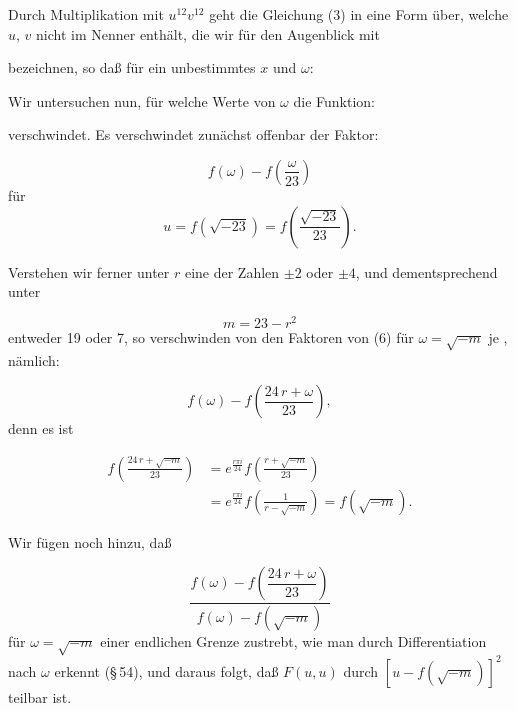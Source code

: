 
Durch Multiplikation mit $u^{12}v^{12}$ geht die Gleichung (3) in eine Form über, welche $u$, $v$ nicht im Nenner enthält, die wir für den Augenblick mit


bezeichnen, so daß für ein unbestimmtes $x$ und $\omega$:


Wir untersuchen nun, für welche Werte von $\omega$ die Funktion:


verschwindet. Es verschwindet zunächst offenbar der Faktor:

\[
f(\omega) - f\left(\frac{\omega}{23}\right)
\]
für
\[
u = f(\sqrt{-23}) = f\left(\frac{\sqrt{-23}}{23}\right).
\]

Verstehen wir ferner unter $r$ eine der Zahlen $\pm 2$ oder $\pm 4$, und dementsprechend unter

\[
m = 23 - r^2
\]
entweder 19 oder 7, so verschwinden von den Faktoren von (6) für $\omega = \sqrt{-m}$ je , nämlich:

\[
f(\omega) - f\left(\frac{24\,r + \omega}{23}\right),
\]
denn es ist

\[
\begin{aligned}
f\left(\frac{24\,r + \sqrt{-m}}{23}\right) &= e^{\frac{r\pi i}{24}} f\left(\frac{r + \sqrt{-m}}{23}\right) \\
&= e^{\frac{r\pi i}{24}} f\left(\frac{1}{r - \sqrt{-m}}\right) = f(\sqrt{-m}).
\end{aligned}
\]

Wir fügen noch hinzu, daß

\[
\frac{f(\omega) - f\left(\dfrac{24\,r + \omega}{23}\right)}{f(\omega) - f(\sqrt{-m})}
\]
für $\omega = \sqrt{-m}$ einer endlichen Grenze zustrebt, wie man durch Differentiation nach $\omega$ erkennt (\S\,54), und daraus folgt, daß $F(u, u)$ durch $[u - f(\sqrt{-m})]^2$ teilbar ist.
